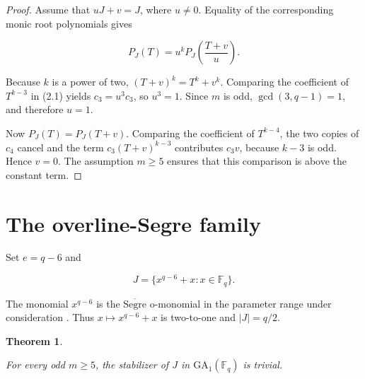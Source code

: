 \documentclass[11pt]{article}
\newtheorem{theorem}{Theorem}[section]
\begin{document}
\begin{proof}

Assume that \(uJ+v=J\), where \(u\ne0\). Equality of the corresponding monic
root polynomials gives

\[
P_J(T)=u^kP_J\!\left(\frac{T+v}{u}\right).
\tag{2.1}
\]

Because \(k\) is a power of two, \((T+v)^k=T^k+v^k\). Comparing the
coefficient of \(T^{k-3}\) in (2.1) yields \(c_3=u^3c_3\), so \(u^3=1\).
Since \(m\) is odd, \(\gcd(3,q-1)=1\), and therefore \(u=1\).

Now \(P_J(T)=P_J(T+v)\). Comparing the coefficient of \(T^{k-4}\), the two
copies of \(c_4\) cancel and the term \(c_3(T+v)^{k-3}\) contributes
\(c_3v\), because \(k-3\) is odd. Hence \(v=0\). The assumption \(m\ge5\)
ensures that this comparison is above the constant term.
\end{proof}


\section{The overline-Segre family}


Set \(e=q-6\) and

\[
J=\{x^{q-6}+x:x\in\mathbb F_q\}.
\]

The monomial \(x^{q-6}\) is the
\(\overline{\mathrm{Segre}}\) o-monomial in the parameter range under
consideration \cite[Theorem~12 and the following identities]{ding-tang}. Thus
\(x\mapsto x^{q-6}+x\) is two-to-one and \(|J|=q/2\).

\Needspace{0.18\textheight}
\begin{theorem}
\label{thm:bar-segre}

For every odd \(m\ge5\), the stabilizer of \(J\) in
\(\mathrm{GA}_1(\mathbb F_q)\) is trivial.

\end{theorem}
\end{document}
